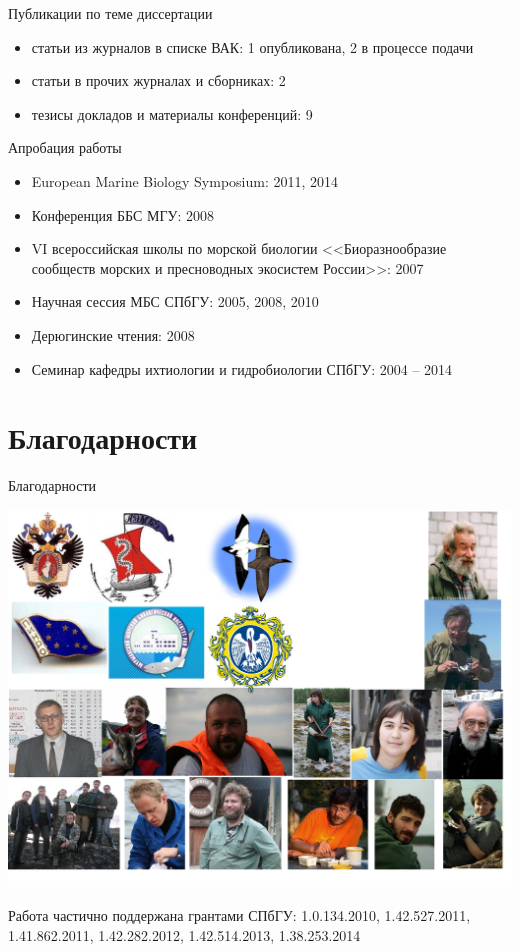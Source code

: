 \documentclass{beamer}
\begin{document}
\begin{frame}{Публикации по теме диссертации}
\begin{itemize}
	\item{статьи из журналов в списке ВАК: 1 опубликована, 2 в процессе подачи}
	\item{статьи в прочих журналах и сборниках: 2}
	\item{тезисы докладов и материалы конференций: 9}
\end{itemize}
\end{frame}


\begin{frame}{Апробация работы}
\begin{itemize}
	\item{European Marine Biology Symposium: 2011, 2014}
	\item{Конференция ББС МГУ: 2008}
	\item{VI всероссийская школы по морской биологии <<Биоразнообразие сообществ морских и пресноводных экосистем России>>: 2007}
	\item{Научная сессия МБС СПбГУ: 2005, 2008, 2010}
	\item{Дерюгинские чтения: 2008}
	\item{Семинар кафедры ихтиологии и гидробиологии СПбГУ: 2004 -- 2014}
\end{itemize}
\end{frame}

		\section*{Благодарности}
\begin{frame}{Благодарности}
\begin{center}
			\includegraphics[height=.7\textheight]{blagodarnosti.pdf}\\
\end{center}
{\tiny Работа частично поддержана грантами СПбГУ: 1.0.134.2010, 1.42.527.2011, 1.41.862.2011, 1.42.282.2012, 1.42.514.2013, 1.38.253.2014}
\end{frame}
\end{document}

